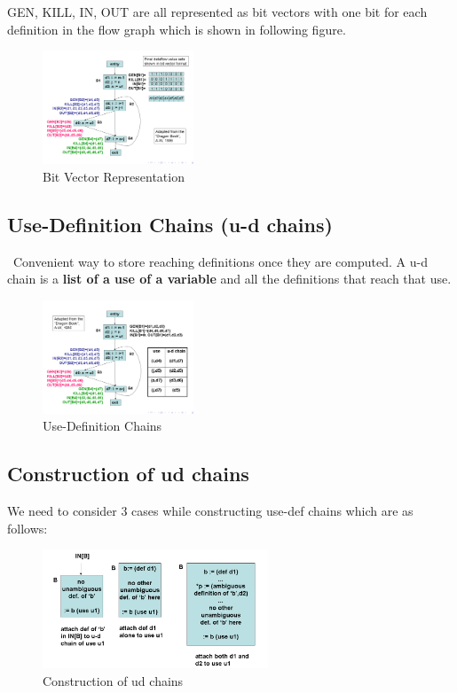 \documentclass{article}
\begin{document}
GEN, KILL, IN, OUT are all represented as bit vectors with one bit for each definition in the flow graph which is shown in following figure. \\

\begin{figure}[h]
    \centering
    \includegraphics[width=0.4\textwidth]{Images/bitVector.png}
    \caption{Bit Vector Representation}
    \label{fig:BitVector}
\end{figure}

\subsection*{Use-Definition Chains (u-d chains)}\
Convenient way to store reaching definitions once they are computed. A u-d chain is a \textbf{list of a use of a variable} and all the definitions that reach that use. \\

\begin{figure}[h]
    \centering
    \includegraphics[width=0.4\textwidth]{Images/udchain.png}
    \caption{Use-Definition Chains}
    \label{fig:udChain}
\end{figure}

\subsection*{Construction of ud chains}
We need to consider 3 cases while constructing use-def chains which are as follows:

\begin{figure}[h]
    \centering
    \includegraphics[width=0.6\textwidth]{Images/udchain2.png}
    \caption{Construction of ud chains}
    \label{fig:udChain}
\end{figure}
\end{document}
